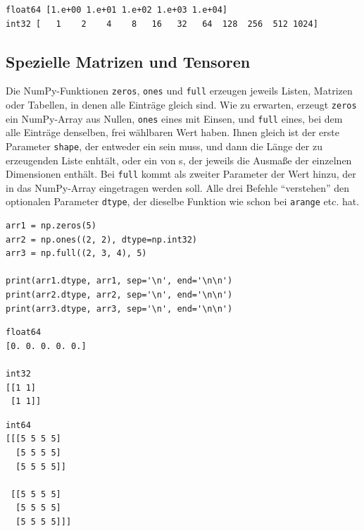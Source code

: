 \begin{cmdbox}
\begin{verbatim}
float64 [1.e+00 1.e+01 1.e+02 1.e+03 1.e+04]
int32 [   1    2    4    8   16   32   64  128  256  512 1024]
\end{verbatim}
\end{cmdbox}

\subsection{Spezielle Matrizen und Tensoren}
Die NumPy-Funktionen \texttt{zeros}, \texttt{ones} und \texttt{full} erzeugen jeweils Listen, Matrizen oder Tabellen, in denen alle Einträge gleich sind. Wie zu erwarten, erzeugt \texttt{zeros} ein NumPy-Array aus Nullen, \texttt{ones} eines mit Einsen, und \texttt{full} eines, bei dem alle Einträge denselben, frei wählbaren Wert haben. Ihnen gleich ist der erste Parameter \texttt{shape}, der entweder ein  sein muss, und dann die Länge der zu erzeugenden Liste enhtält, oder ein  von s, der jeweils die Ausmaße der einzelnen Dimensionen enthält. Bei \texttt{full} kommt als zweiter Parameter der Wert hinzu, der in das NumPy-Array eingetragen werden soll. Alle drei Befehle \enquote{verstehen} den optionalen Parameter \texttt{dtype}, der dieselbe Funktion wie schon bei \texttt{arange} etc. hat.

\begin{codebox}
\begin{verbatim}
arr1 = np.zeros(5)
arr2 = np.ones((2, 2), dtype=np.int32)
arr3 = np.full((2, 3, 4), 5)

print(arr1.dtype, arr1, sep='\n', end='\n\n')
print(arr2.dtype, arr2, sep='\n', end='\n\n')
print(arr3.dtype, arr3, sep='\n', end='\n\n')
\end{verbatim}
\end{codebox}

\begin{cmdbox}
\begin{verbatim}
float64
[0. 0. 0. 0. 0.]

int32
[[1 1]
 [1 1]]
\end{verbatim}
\end{cmdbox}
%
\begin{cmdbox}[]
\begin{verbatim}
int64
[[[5 5 5 5]
  [5 5 5 5]
  [5 5 5 5]]

 [[5 5 5 5]
  [5 5 5 5]
  [5 5 5 5]]]
\end{verbatim}
\end{cmdbox}

